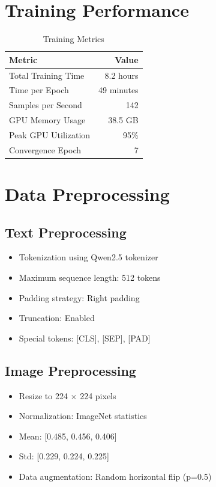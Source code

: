 \documentclass[10pt,a4paper]{article}
\begin{document}
\section{Training Performance}

\begin{table}[h]
\centering
\caption{Training Metrics}
\begin{tabular}{lr}
\toprule
\rowcolor{headerblue}
\textbf{Metric} & \textbf{Value} \\
\midrule
Total Training Time     & 8.2 hours \\
Time per Epoch          & 49 minutes \\
Samples per Second      & 142 \\
GPU Memory Usage        & 38.5 GB \\
Peak GPU Utilization    & 95\% \\
Convergence Epoch       & 7 \\
\bottomrule
\end{tabular}
\end{table}

\section{Data Preprocessing}

\subsection{Text Preprocessing}
\begin{itemize}
\item Tokenization using Qwen2.5 tokenizer
\item Maximum sequence length: 512 tokens
\item Padding strategy: Right padding
\item Truncation: Enabled
\item Special tokens: [CLS], [SEP], [PAD]
\end{itemize}

\subsection{Image Preprocessing}
\begin{itemize}
\item Resize to 224 $\times$ 224 pixels
\item Normalization: ImageNet statistics
\item Mean: [0.485, 0.456, 0.406]
\item Std: [0.229, 0.224, 0.225]
\item Data augmentation: Random horizontal flip (p=0.5)
\end{itemize}
\end{document}
